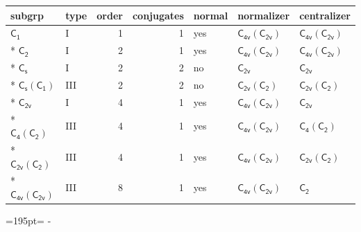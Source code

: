 \documentclass[10pt,a4paper]{article}
\newcommand{\needspace}[1]{\par\penalty-100\begingroup\dimen0=#1\relax\dimen2=\pagegoal
  \advance\dimen2-\pagetotal\ifdim\dimen0>\dimen2\relax\ifdim\dimen2>0pt\vfil\break\fi\fi
  \endgroup}
\numberwithin{equation}{section}
\newcommand{\grp}[1]{\mathsf{#1}}
\begin{document}
{\small\begin{longtable}{@{}llrrlll@{}}\toprule
subgrp & type & order & conjugates & normal & normalizer & centralizer\\\midrule\endhead
\bottomrule\endfoot\endlastfoot
\href{../../../rotation/data/pdf/C1.pdf}{$\grp{C_{1}}$} & I & 1 & 1 & yes & \href{C4v-C2v.pdf}{$\grp{C_{4v}}(\grp{C_{2v}})$} & \href{C4v-C2v.pdf}{$\grp{C_{4v}}(\grp{C_{2v}})$}\\*
\href{../../../rotation/data/pdf/C2.pdf}{$\grp{C_{2}}$} & I & 2 & 1 & yes & \href{C4v-C2v.pdf}{$\grp{C_{4v}}(\grp{C_{2v}})$} & \href{C4v-C2v.pdf}{$\grp{C_{4v}}(\grp{C_{2v}})$}\\*
\href{../../../rotation/data/pdf/C1v.pdf}{$\grp{C_{s}}$} & I & 2 & 2 & no & \href{../../../rotation/data/pdf/C2v.pdf}{$\grp{C_{2v}}$} & \href{../../../rotation/data/pdf/C2v.pdf}{$\grp{C_{2v}}$}\\*
\href{C1v-C1.pdf}{$\grp{C_{s}}(\grp{C_{1}})$} & III & 2 & 2 & no & \href{C2v-C2.pdf}{$\grp{C_{2v}}(\grp{C_{2}})$} & \href{C2v-C2.pdf}{$\grp{C_{2v}}(\grp{C_{2}})$}\\*
\href{../../../rotation/data/pdf/C2v.pdf}{$\grp{C_{2v}}$} & I & 4 & 1 & yes & \href{C4v-C2v.pdf}{$\grp{C_{4v}}(\grp{C_{2v}})$} & \href{../../../rotation/data/pdf/C2v.pdf}{$\grp{C_{2v}}$}\\*
\href{C4-C2.pdf}{$\grp{C_{4}}(\grp{C_{2}})$} & III & 4 & 1 & yes & \href{C4v-C2v.pdf}{$\grp{C_{4v}}(\grp{C_{2v}})$} & \href{C4-C2.pdf}{$\grp{C_{4}}(\grp{C_{2}})$}\\*
\href{C2v-C2.pdf}{$\grp{C_{2v}}(\grp{C_{2}})$} & III & 4 & 1 & yes & \href{C4v-C2v.pdf}{$\grp{C_{4v}}(\grp{C_{2v}})$} & \href{C2v-C2.pdf}{$\grp{C_{2v}}(\grp{C_{2}})$}\\*
\href{C4v-C2v.pdf}{$\grp{C_{4v}}(\grp{C_{2v}})$} & III & 8 & 1 & yes & \href{C4v-C2v.pdf}{$\grp{C_{4v}}(\grp{C_{2v}})$} & \href{../../../rotation/data/pdf/C2.pdf}{$\grp{C_{2}}$}\\
\bottomrule\end{longtable}}
\needspace{195pt}
\end{document}
